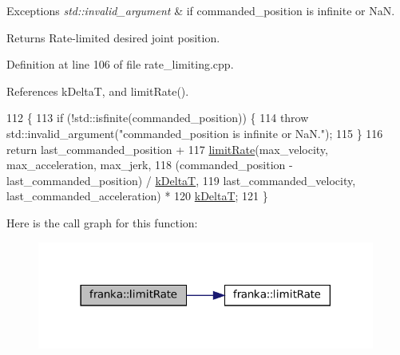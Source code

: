 \begin{DoxyExceptions}{Exceptions}
{\em std\+::invalid\+\_\+argument} & if commanded\+\_\+position is infinite or NaN.\\
\hline
\end{DoxyExceptions}
\begin{DoxyReturn}{Returns}
Rate-\/limited desired joint position. 
\end{DoxyReturn}


Definition at line 106 of file rate\+\_\+limiting.\+cpp.



References k\+DeltaT, and limit\+Rate().


\begin{DoxyCode}
112                                                      \{
113   \textcolor{keywordflow}{if} (!std::isfinite(commanded\_position)) \{
114     \textcolor{keywordflow}{throw} std::invalid\_argument(\textcolor{stringliteral}{"commanded\_position is infinite or NaN."});
115   \}
116   \textcolor{keywordflow}{return} last\_commanded\_position +
117          \hyperlink{namespacefranka_1_1anonymous__namespace_02rate__limiting_8cpp_03_aa1d64bbd7b303af83e6a76b92298d73a}{limitRate}(max\_velocity, max\_acceleration, max\_jerk,
118                    (commanded\_position - last\_commanded\_position) / \hyperlink{namespacefranka_a1e207a0d5a6e90c1e1a78e6e1057120a}{kDeltaT},
119                    last\_commanded\_velocity, last\_commanded\_acceleration) *
120              \hyperlink{namespacefranka_a1e207a0d5a6e90c1e1a78e6e1057120a}{kDeltaT};
121 \}
\end{DoxyCode}
Here is the call graph for this function\+:
\nopagebreak
\begin{figure}[H]
\begin{center}
\leavevmode
\includegraphics[width=314pt]{namespacefranka_a795142512ca54c220b2f2d52e239e35d_cgraph}
\end{center}
\end{figure}
\mbox{\label{namespacefranka_aa778ddc24969b8eac4f26e86858dfb5a}} 
